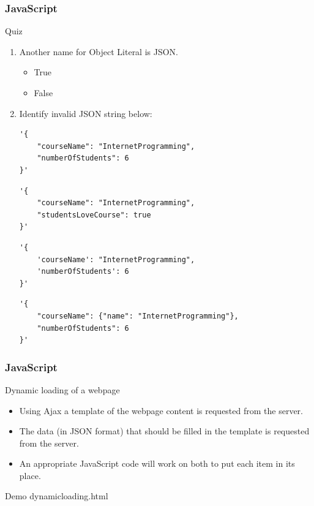 \documentclass[xcolor=dvipsnames,10pt]{beamer}
\begin{document}
\begin{frame}[fragile]
\frametitle{JavaScript}
\begin{block}{Quiz}
\begin{enumerate}
	\item Another name for Object Literal is JSON.
	\begin{itemize}
		\item True
		\item False
	\end{itemize}	
	\item Identify invalid JSON string below:
\footnotesize
{\color{blue}		
\begin{verbatim}
'{
    "courseName": "InternetProgramming",
    "numberOfStudents": 6
}'
\end{verbatim}}
\begin{verbatim}
'{
    "courseName": "InternetProgramming",
    "studentsLoveCourse": true
}'
\end{verbatim}
{\color{blue}
\begin{verbatim}
'{
    'courseName': "InternetProgramming",
    'numberOfStudents': 6
}'
\end{verbatim}}
\begin{verbatim}
'{
    "courseName": {"name": "InternetProgramming"},
    "numberOfStudents": 6
}'
\end{verbatim}
\normalsize	
\end{enumerate}
\end{block}
\end{frame}
\begin{frame}[fragile]
\frametitle{JavaScript}
\begin{block}{Dynamic loading of a webpage}
\begin{itemize}
	\item Using Ajax a template of the webpage content is requested from the server.
	\item The data (in JSON format) that should be filled in the template is requested from the server.
	\item An appropriate JavaScript code will work on both to put each item in its place.
\end{itemize}	
\end{block}
\begin{block}{Demo}
	dynamicloading.html
\end{block}
\end{frame}
\end{document}
